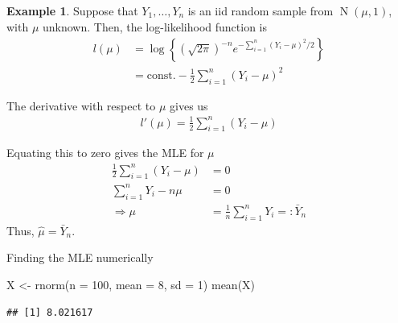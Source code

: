 \documentclass[
]{book}
\newenvironment{Shaded}{\begin{snugshade}}{\end{snugshade}}
\newcommand{\AttributeTok}[1]{\textcolor[rgb]{0.77,0.63,0.00}{#1}}
\newcommand{\CommentTok}[1]{\textcolor[rgb]{0.56,0.35,0.01}{\textit{#1}}}
\newcommand{\ConstantTok}[1]{\textcolor[rgb]{0.00,0.00,0.00}{#1}}
\newcommand{\ControlFlowTok}[1]{\textcolor[rgb]{0.13,0.29,0.53}{\textbf{#1}}}
\newcommand{\DecValTok}[1]{\textcolor[rgb]{0.00,0.00,0.81}{#1}}
\newcommand{\FunctionTok}[1]{\textcolor[rgb]{0.00,0.00,0.00}{#1}}
\newcommand{\NormalTok}[1]{#1}
\newcommand{\OtherTok}[1]{\textcolor[rgb]{0.56,0.35,0.01}{#1}}
\newcommand{\SpecialCharTok}[1]{\textcolor[rgb]{0.00,0.00,0.00}{#1}}
\newcommand{\StringTok}[1]{\textcolor[rgb]{0.31,0.60,0.02}{#1}}
\DeclareMathOperator{\N}{N}
\newcommand{\const}{\text{const.}}
\theoremstyle{definition}
\theoremstyle{definition}
\newtheorem{example}{Example}[chapter]
\theoremstyle{definition}
\theoremstyle{definition}
\theoremstyle{remark}
\begin{document}
\begin{example}
Suppose that \(Y_1,\dots,Y_n\) is an iid random sample from
\(\N(\mu,1)\), with \(\mu\) unknown. Then,
the log-likelihood function is \[\begin{aligned}
     l(\mu)
     &= \log \left\{(\sqrt{2\pi})^{-n} e^{-\sum_{i=1}^n (Y_i-\mu)^2/2} \right\} \\
     &= \const 
     -\frac{1}{2}\sum_{i=1}^n  (Y_i-\mu)^2
     \end{aligned}\]

The derivative with respect to \(\mu\) gives us
\[\begin{aligned}
       l'(\mu) = \frac{1}{2}\sum_{i=1}^n  (Y_i-\mu)
     \end{aligned}\]

Equating this to zero gives the MLE for \(\mu\) \[\begin{aligned}
       \frac{1}{2}\sum_{i=1}^n  (Y_i-\mu) &= 0 \\
       \sum_{i=1}^n Y_i - n\mu  &= 0 \\
       \Rightarrow \mu &= \frac{1}{n}\sum_{i=1}^n Y_i =: \bar Y_n
     \end{aligned}\] Thus, \(\hat\mu=\bar Y_n\).
\end{example}

Finding the MLE numerically

\begin{Shaded}
\begin{Highlighting}[]
\NormalTok{X }\OtherTok{\textless{}{-}} \FunctionTok{rnorm}\NormalTok{(}\AttributeTok{n =} \DecValTok{100}\NormalTok{, }\AttributeTok{mean =} \DecValTok{8}\NormalTok{, }\AttributeTok{sd =} \DecValTok{1}\NormalTok{)}
\FunctionTok{mean}\NormalTok{(X)}
\end{Highlighting}
\end{Shaded}

\begin{verbatim}
## [1] 8.021617
\end{verbatim}

\begin{Shaded}
\end{Shaded}
\end{document}
